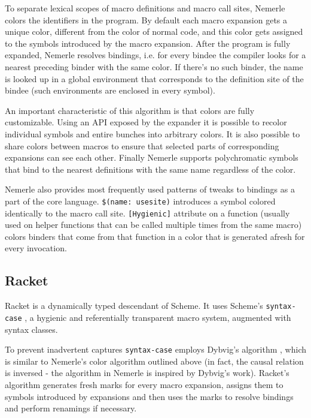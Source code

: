 \documentclass[10pt,journal,a4paper]{IEEEtran}
\begin{document}
To separate lexical scopes of macro definitions and macro call sites, Nemerle colors the
identifiers in the program. By default each macro expansion gets a unique color, different from
the color of normal code, and this color gets assigned to the symbols introduced by the macro expansion.
After the program
is fully expanded, Nemerle resolves bindings, i.e. for every bindee the compiler looks for
a nearest preceding binder with the same color.
If there's no such binder, the name is looked up
in a global environment that corresponds to the definition site of the bindee (such environments
are enclosed in every symbol).

An important characteristic of this algorithm is that colors are fully customizable.
Using an API exposed by the expander it is possible to recolor individual symbols and
entire bunches into arbitrary colors. It is also possible to share colors between macros
to ensure that selected parts of corresponding expansions can see each other.
Finally Nemerle supports polychromatic symbols that bind
to the nearest definitions with the same name regardless of the color.

Nemerle also provides most frequently used patterns of tweaks to bindings as a part of the core language.
\small \texttt{\$(name:~usesite)} \normalsize introduces a symbol colored identically to the macro call site.
\small \texttt{[Hygienic]} \normalsize attribute on a function (usually used on helper functions that can be
called multiple times from the same macro) colors binders that come from that function in a color that
is generated afresh for every invocation.

\subsection{Racket}

Racket is a dynamically typed descendant of Scheme.
It uses Scheme's \small \texttt{syntax-case} \normalsize, a hygienic and referentially
transparent macro system, augmented with syntax classes.

To prevent inadvertent captures \small \texttt{syntax-case} \normalsize employs Dybvig's algorithm
\cite{dybvig92},
which is similar to Nemerle's color algorithm outlined above (in fact, the causal relation is inversed -
the algorithm in Nemerle is inspired by Dybvig's work). Racket's algorithm generates fresh marks for
every macro expansion, assigns them to symbols introduced by expansions and then uses the marks to
resolve bindings and perform renamings if necessary.
\end{document}
